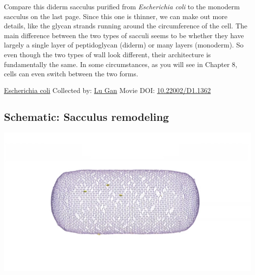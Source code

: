\documentclass[]{tufte-book}
\begin{document}
Compare this diderm sacculus purified from \emph{Escherichia coli} to the monoderm sacculus on the last page. Since this one is thinner, we can make out more details, like the glycan strands running around the circumference of the cell. The main difference between the two types of sacculi seems to be whether they have largely a single layer of peptidoglycan (diderm) or many layers (monoderm). So even though the two types of wall look different, their architecture is fundamentally the same. In some circumstances, as you will see in Chapter 8, cells can even switch between the two forms.



\hypertarget{htmlwidget-c98d87bcbdbbc3e51cb2}{}

\label{fig:2-3a}\protect\hyperlink{tree}{Escherichia coli} Collected by: \protect\hyperlink{lu_gan}{Lu Gan} Movie DOI: \href{https://doi.org/10.22002/D1.1362}{10.22002/D1.1362}

\hypertarget{Sacculus_remodeling}{%
\subsection*{Schematic: Sacculus remodeling}\label{Sacculus_remodeling}}

\includegraphics{img/schematics/2_3_2}
\end{document}
